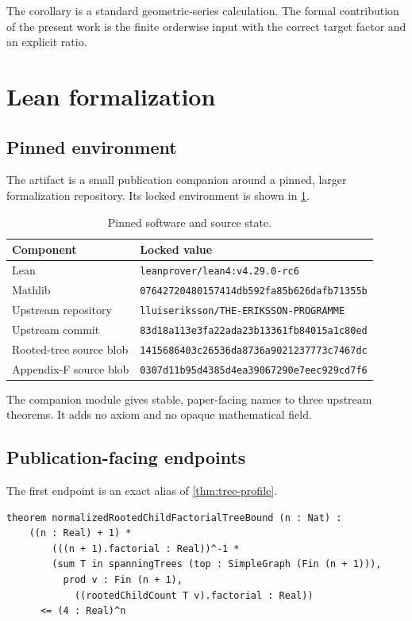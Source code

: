 \documentclass[11pt]{article}
\begin{document}
The corollary is a standard geometric-series calculation.  The formal contribution of the present work is the finite orderwise input with the correct target factor and an explicit ratio.

\section{Lean formalization}

\subsection{Pinned environment}

The artifact is a small publication companion around a pinned, larger formalization repository.  Its locked environment is shown in \cref{tab:versions}.

\begin{table}[h]
\centering
\caption{Pinned software and source state.}
\label{tab:versions}
\begin{tabular}{@{}ll@{}}
\toprule
Component & Locked value \\
\midrule
Lean & \texttt{leanprover/lean4:v4.29.0-rc6} \\
Mathlib & \texttt{07642720480157414db592fa85b626dafb71355b} \\
Upstream repository & \texttt{lluiseriksson/THE-ERIKSSON-PROGRAMME} \\
Upstream commit & \texttt{83d18a113e3fa22ada23b13361fb84015a1c80ed} \\
Rooted-tree source blob & \texttt{1415686403c26536da8736a9021237773c7467dc} \\
Appendix-F source blob & \texttt{0307d11b95d4385d4ea39067290e7eec929cd7f6} \\
\bottomrule
\end{tabular}
\end{table}

The companion module gives stable, paper-facing names to three upstream theorems.  It adds no axiom and no opaque mathematical field.

\subsection{Publication-facing endpoints}

The first endpoint is an exact alias of \cref{thm:tree-profile}.

\begin{lstlisting}[caption={The normalized rooted child-factorial bound.}]
theorem normalizedRootedChildFactorialTreeBound (n : Nat) :
    ((n : Real) + 1) *
        (((n + 1).factorial : Real))^-1 *
        (sum T in spanningTrees (top : SimpleGraph (Fin (n + 1))),
          prod v : Fin (n + 1),
            ((rootedChildCount T v).factorial : Real))
      <= (4 : Real)^n
\end{lstlisting}
\end{document}

